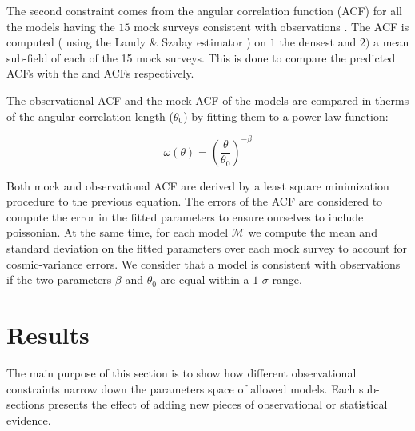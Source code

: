 \documentclass[usenatbib]{mn2e}
\begin{document}
The second constraint  comes from the angular correlation function (ACF)
for all the models having the $15$ mock surveys consistent with
observations . The ACF is computed  ( using 
the Landy \&  Szalay  estimator \citep{Landy1993} )  on $1$ the densest
and $2)$ a mean sub-field of each of the 15 mock surveys. This is done to 
compare the predicted ACFs with the \cite{Hayashino2004}  and \cite{Ouchi2010}
ACFs respectively. 

The observational ACF and the  mock  ACF of the models are compared   
in therms of the angular correlation length ($\theta_{0}$) by fitting 
them to a power-law function:  

\begin{equation}
\omega(\theta) = \left(\frac{\theta}{\theta_{0}}\right)^{-\beta}
\label{eq:fitting}
\end{equation}

Both mock and observational ACF are derived by a least
square minimization procedure to the previous equation. The  errors of 
the ACF  are considered to compute the error in the fitted parameters to ensure ourselves
to include poissonian. At the same time, for each model ${\mathcal M}$ we 
compute the mean and standard deviation on the fitted parameters over
each mock survey to account for cosmic-variance errors. 
We consider that a model is consistent with observations if the two
parameters $\beta$ and $\theta_0$ are equal within a $1$-$\sigma$ range. 



 
\section{Results}
\label{sec:results}

The main purpose of this section is to show how different
observational constraints narrow down the parameters space of allowed
models. Each sub-sections presents the effect of adding new pieces of
observational or statistical evidence. 
\end{document}
